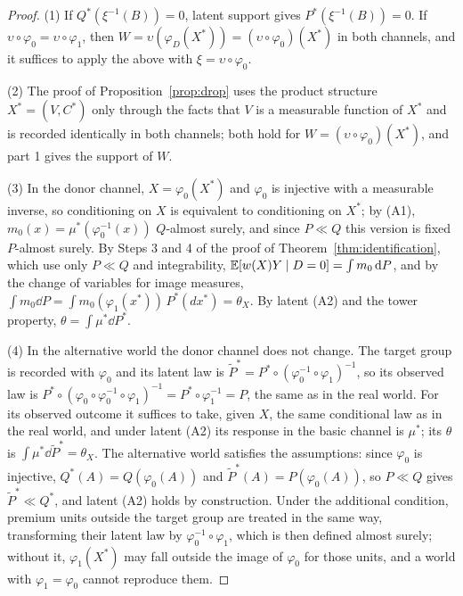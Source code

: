 \begin{proof}
(1) If $Q^*(\xi^{-1}(B))=0$, latent support gives $P^*(\xi^{-1}(B))=0$. If $\upsilon\circ\varphi_0=\upsilon\circ\varphi_1$, then $W=\upsilon(\varphi_D(X^*))=(\upsilon\circ\varphi_0)(X^*)$ in both channels, and it suffices to apply the above with $\xi=\upsilon\circ\varphi_0$.

(2) The proof of Proposition~\ref{prop:drop} uses the product structure $X^*=(V,C^*)$ only through the facts that $V$ is a measurable function of $X^*$ and is recorded identically in both channels; both hold for $W=(\upsilon\circ\varphi_0)(X^*)$, and part 1 gives the support of $W$.

(3) In the donor channel, $X=\varphi_0(X^*)$ and $\varphi_0$ is injective with a measurable inverse, so conditioning on $X$ is equivalent to conditioning on $X^*$; by (A1), $m_0(x)=\mu^*(\varphi_0^{-1}(x))$ $Q$-almost surely, and since $P\ll Q$ this version is fixed $P$-almost surely. By Steps 3 and 4 of the proof of Theorem~\ref{thm:identification}, which use only $P\ll Q$ and integrability, $\mathbb{E}[w(X)Y\mid D=0]=\int m_0\,\mathrm{d} P$, and by the change of variables for image measures, $\int m_0\dd P=\int m_0(\varphi_1(x^*))\,P^*(dx^*)=\theta_X$. By latent (A2) and the tower property, $\theta=\int\mu^*\dd P^*$.

(4) In the alternative world the donor channel does not change. The target group is recorded with $\varphi_0$ and its latent law is $\tilde P^*=P^*\circ(\varphi_0^{-1}\circ\varphi_1)^{-1}$, so its observed law is $P^*\circ(\varphi_0\circ\varphi_0^{-1}\circ\varphi_1)^{-1}=P^*\circ\varphi_1^{-1}=P$, the same as in the real world. For its observed outcome it suffices to take, given $X$, the same conditional law as in the real world, and under latent (A2) its response in the basic channel is $\mu^*$; its $\theta$ is $\int\mu^*\dd\tilde P^*=\theta_X$. The alternative world satisfies the assumptions: since $\varphi_0$ is injective, $Q^*(A)=Q(\varphi_0(A))$ and $\tilde P^*(A)=P(\varphi_0(A))$, so $P\ll Q$ gives $\tilde P^*\ll Q^*$, and latent (A2) holds by construction. Under the additional condition, premium units outside the target group are treated in the same way, transforming their latent law by $\varphi_0^{-1}\circ\varphi_1$, which is then defined almost surely; without it, $\varphi_1(X^*)$ may fall outside the image of $\varphi_0$ for those units, and a world with $\varphi_1=\varphi_0$ cannot reproduce them.
\end{proof}

